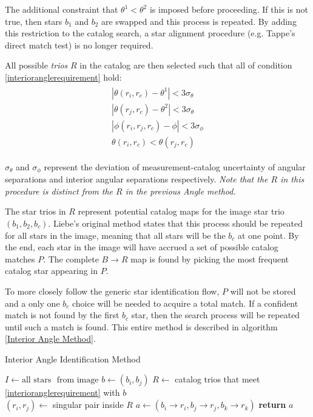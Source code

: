The additional constraint that $\theta^1 < \theta^2$ is imposed before proceeding. If this is not true, then stars $b_1$ and $b_2$ are swapped and this process is repeated. By adding this restriction to the catalog search, a star alignment procedure (e.g. Tappe's direct match test) is no longer required. 

All possible \textit{trios} $R$ in the catalog are then selected such that all of condition \eqref{interioranglerequirement} hold:
\begin{align} \label{interioranglerequirement}
\begin{split}
|\theta(r_i, r_c) - \theta^1| < 3 \sigma_{\theta}
\\
|\theta(r_j, r_c) - \theta^2| < 3 \sigma_{\theta}
\\
|\phi(r_i, r_j, r_c) - \phi| < 3 \sigma_{\phi}
\\
\theta(r_i, r_c) < \theta(r_j, r_c)
\end{split}
\end{align}

$\sigma_{\theta}$ and $\sigma_{\phi}$ represent the deviation of measurement-catalog uncertainty of angular separations and interior angular separations respectively. \textit{Note that the $R$ in this procedure is distinct from the $R$ in the previous Angle method.}

The star trios in $R$ represent potential catalog maps for the image star trio $(b_1, b_2, b_c)$. Liebe's original method states that this process should be repeated for all stars in the image, meaning that all stars will be the $b_c$ at one point. By the end, each star in the image will have accrued a set of possible catalog matches $P$. The complete $B \rightarrow R$ map is found by picking the most frequent catalog star appearing in $P$. 

To more closely follow the generic star identification flow, $P$ will not be stored and a only one $b_c$ choice will be needed to acquire a total match. If a confident match is not found by the first $b_c$ star, then the search process will be repeated until such a match is found. This entire method is described in algorithm \eqref{Interior Angle Method}.

\begin{algorithm}
\caption{Interior Angle Identification Method}
\label{Interior Angle Method}
\begin{algorithmic}[1]

\State $I \gets \text{all stars } \text{ from image}$
\State $b \gets (b_i, b_j)$
\State $R \gets $ catalog trios that meet \eqref{interioranglerequirement} with $b$
\\
\State $(r_i, r_j) \gets $ singular pair inside $R$
\State $a \gets (b_i \rightarrow r_i, b_j \rightarrow r_j, b_k \rightarrow r_k)$
\State \textbf{return} $a$
\EndIf
\EndFor
\EndFor
\EndFor
\EndProcedure
\end{algorithmic}
\end{algorithm}


